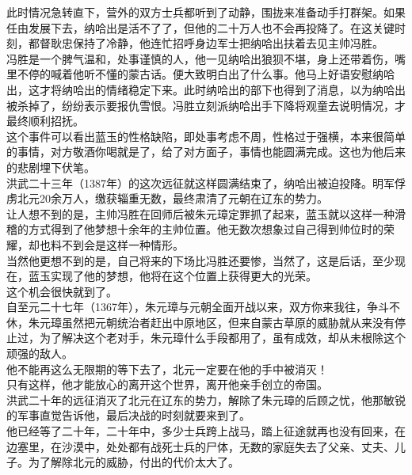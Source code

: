 \begin{multicols}{\theparacolNo}
此时情况急转直下，营外的双方士兵都听到了动静，围拢来准备动手打群架。如果任由发展下去，纳哈出是活不了了，但他的二十万人也不会再投降了。在这关键时刻，都督耿忠保持了冷静，他连忙招呼身边军士把纳哈出扶着去见主帅冯胜。\\

冯胜是一个脾气温和，处事谨慎的人，他一见纳哈出狼狈不堪，身上还带着伤，嘴里不停的喊着他听不懂的蒙古话。便大致明白出了什么事。他马上好语安慰纳哈出，这才将纳哈出的情绪稳定下来。此时纳哈出的部下也得到了消息，以为纳哈出被杀掉了，纷纷表示要报仇雪恨。冯胜立刻派纳哈出手下降将观童去说明情况，才最终顺利招抚。\\

这个事件可以看出蓝玉的性格缺陷，即处事考虑不周，性格过于强横，本来很简单的事情，对方敬酒你喝就是了，给了对方面子，事情也能圆满完成。这也为他后来的悲剧埋下伏笔。\\

洪武二十三年（1387年）的这次远征就这样圆满结束了，纳哈出被迫投降。明军俘虏北元20余万人，缴获辎重无数，最终肃清了元朝在辽东的势力。\\

让人想不到的是，主帅冯胜在回师后被朱元璋定罪抓了起来，蓝玉就以这样一种滑稽的方式得到了他梦想十余年的主帅位置。他无数次想象过自己得到帅位时的荣耀，却也料不到会是这样一种情形。\\

当然他更想不到的是，自己将来的下场比冯胜还要惨，当然了，这是后话，至少现在，蓝玉实现了他的梦想，他将在这个位置上获得更大的光荣。\\

这个机会很快就到了。\\

自至元二十七年（1367年），朱元璋与元朝全面开战以来，双方你来我往，争斗不休，朱元璋虽然把元朝统治者赶出中原地区，但来自蒙古草原的威胁就从来没有停止过，为了解决这个老对手，朱元璋什么手段都用了，虽有成效，却从未根除这个顽强的敌人。\\

他不能再这么无限期的等下去了，北元一定要在他的手中被消灭！\\

只有这样，他才能放心的离开这个世界，离开他亲手创立的帝国。\\

洪武二十年的远征消灭了北元在辽东的势力，解除了朱元璋的后顾之忧，他那敏锐的军事直觉告诉他，最后决战的时刻就要来到了。\\

他已经等了二十年，二十年中，多少士兵跨上战马，踏上征途就再也没有回来，在边塞里，在沙漠中，处处都有战死士兵的尸体，无数的家庭失去了父亲、丈夫、儿子。为了解除北元的威胁，付出的代价太大了。\\


\end{multicols}
